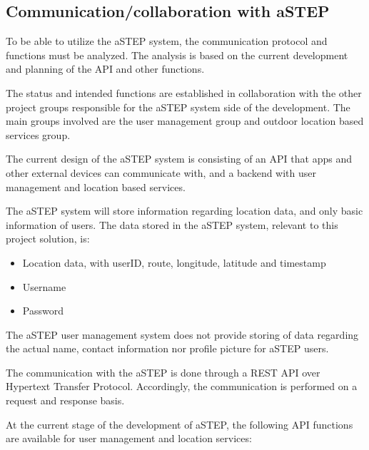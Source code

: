 \subsection{Communication/collaboration with aSTEP}
To be able to utilize the aSTEP system, the communication protocol and functions must be analyzed. 
The analysis is based on the current development and planning of the API and other functions.

The status and intended functions are established in collaboration with the other project groups responsible for the aSTEP system side of the development. 
The main groups involved are the user management group and outdoor location based services group.

The current design of the aSTEP system is consisting of an API that apps and other external devices can communicate with, and a backend with user management and location based services.


The aSTEP system will store information regarding location data, and only basic information of users. 
The data stored in the aSTEP system, relevant to this project solution, is:
\begin{itemize}
	\item Location data, with userID, route, longitude, latitude and timestamp
	\item Username
	\item Password
\end{itemize}

The aSTEP user management system does not provide storing of data regarding the actual name, contact information nor profile picture for aSTEP users. 


The communication with the aSTEP is done through a REST API over Hypertext Transfer Protocol.
Accordingly, the communication is performed on a request and response basis. 


At the current stage of the development of aSTEP, the following API functions are available for user management and location services:


